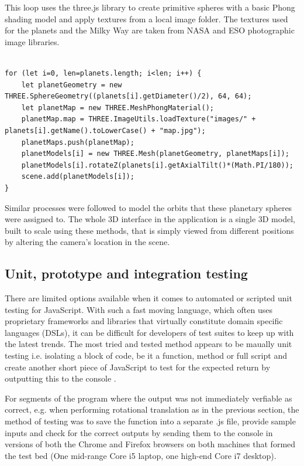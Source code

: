 \documentclass[twoside]{bhamthesis}
\begin{document}
This loop uses the three.js library to create primitive spheres with a basic Phong shading model and apply textures from a local image folder.  The textures used for the planets and the Milky Way are taken from NASA and ESO photographic image libraries.


\begin{lstlisting}[label=Loop using three.js objects and methods to create planetary spheres, caption=Loop using three.js objects and methods to create planetary spheres, captionpos=b]

for (let i=0, len=planets.length; i<len; i++) {
	let planetGeometry = new THREE.SphereGeometry((planets[i].getDiameter()/2), 64, 64);
	let planetMap = new THREE.MeshPhongMaterial();
	planetMap.map = THREE.ImageUtils.loadTexture("images/" + planets[i].getName().toLowerCase() + "map.jpg");
	planetMaps.push(planetMap);
	planetModels[i] = new THREE.Mesh(planetGeometry, planetMaps[i]);
	planetModels[i].rotateZ(planets[i].getAxialTilt()*(Math.PI/180));
	scene.add(planetModels[i]);
}

\end{lstlisting}

Similar processes were followed to model the orbits that these planetary spheres were assigned to. The whole 3D interface in the application is a single 3D model, built to scale using these methods, that is simply viewed from different positions by altering the camera's location in the scene.


\subsection{Unit, prototype and integration testing}

There are limited options available when it comes to automated or scripted unit testing for JavaScript. With such a fast moving language, which often uses proprietary frameworks and libraries that virtually constitute domain specific languages (DSLs), it can be difficult for developers of test suites to keep up with the latest trends.
The most tried and tested method appears to be maually unit testing i.e. isolating a block of code, be it a function, method or full script and create another short piece of JavaScript to test for the expected return by outputting this to the console \cite{zaefferer_introduction_2012}.

For segments of the program where the output was not immediately verfiable as correct, e.g. when performing rotational translation as in the previous section, the method of testing was to save the function into a separate .js file, provide sample inputs and check for the correct outputs by sending them to the console in versions of both the Chrome and Firefox browsers on both machines that formed the test bed (One mid-range Core i5 laptop, one high-end Core i7 desktop).
\end{document}
